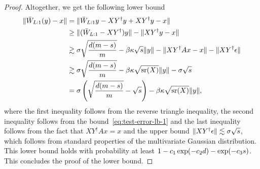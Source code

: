\begin{proof}
Altogether, we get the following lower bound
\begin{align*}
    \lVert\bar W_{L:1}(y)-x\rVert&= \lVert\bar W_{L:1}y-XY^{\dag}y+XY^{\dag}y-x\rVert \\
    &\geq \lVert(\bar W_{L:1}-XY^{\dag}) y\rVert - \lVert XY^{\dag}y-x\rVert\\
    & \gtrsim
    \sigma \sqrt{\frac{d(m - s)}{m}}
    - \beta \kappa \sqrt{s} \lVert y\rVert -
    \lVert XY^{\dag} Ax - x\rVert - \lVert XY^{\dag} \epsilon\rVert \\
    & \gtrsim \sigma \sqrt{\frac{d (m - s)}{m}} - \beta \kappa \sqrt{\operatorname{\mathrm{sr}}(X)} \lVert y\rVert - \sigma \sqrt{s} \\
    &= \sigma \left(
    \sqrt{\frac{d(m - s)}{m}} - \sqrt{s}
    \right) -
    \beta \kappa \sqrt{\operatorname{\mathrm{sr}}(X)} \lVert y\rVert,
\end{align*}
where the first inequality follows from the reverse triangle inequality, the second inequality follows from
the bound~\eqref{eq:test-error-lb-1} and the last inequality follows from the fact that $XY^{\dag} Ax = x$ and the upper bound $\lVert XY^{\dag} \epsilon\rVert \lesssim \sigma \sqrt{s}$, which follows from standard properties of the multivariate Gaussian distribution. This lower bound holds
with probability at least $1 - c_1 \exp(-c_2 d) - \exp(-c_3 s)$.
This concludes the proof of the lower bound.
\end{proof}
